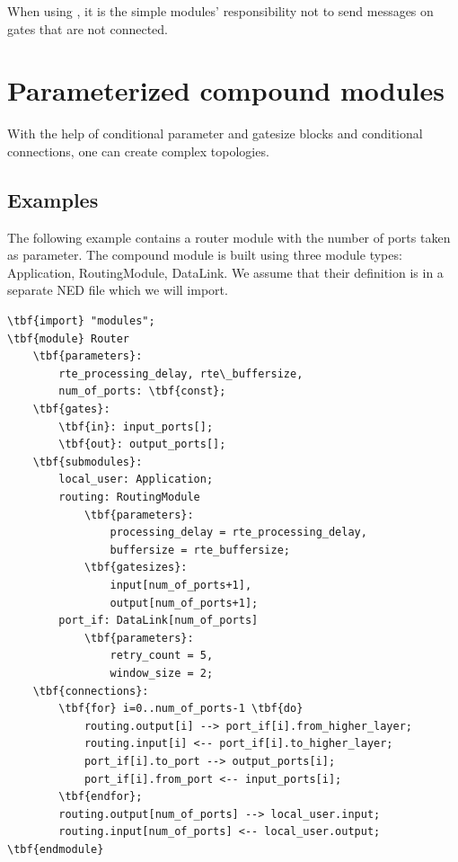 When using , it is the simple modules' responsibility
not to send messages on gates that are not connected.





\section{Parameterized compound modules}


With the help of conditional parameter and gatesize blocks and
conditional connections, one can create complex topologies.





\subsection{Examples}


The following example contains a router module with the number of
ports taken as parameter. The compound module is built using three
module types: Application, RoutingModule, DataLink. We assume that
their definition is in a separate NED file which we will import.


\begin{Verbatim}[commandchars=\\\{\}]
\tbf{import} "modules";
\tbf{module} Router
    \tbf{parameters}:
        rte_processing_delay, rte\_buffersize,
        num_of_ports: \tbf{const};
    \tbf{gates}:
        \tbf{in}: input_ports[];
        \tbf{out}: output_ports[];
    \tbf{submodules}:
        local_user: Application;
        routing: RoutingModule
            \tbf{parameters}:
                processing_delay = rte_processing_delay,
                buffersize = rte_buffersize;
            \tbf{gatesizes}:
                input[num_of_ports+1],
                output[num_of_ports+1];
        port_if: DataLink[num_of_ports]
            \tbf{parameters}:
                retry_count = 5,
                window_size = 2;
    \tbf{connections}:
        \tbf{for} i=0..num_of_ports-1 \tbf{do}
            routing.output[i] --> port_if[i].from_higher_layer;
            routing.input[i] <-- port_if[i].to_higher_layer;
            port_if[i].to_port --> output_ports[i];
            port_if[i].from_port <-- input_ports[i];
        \tbf{endfor};
        routing.output[num_of_ports] --> local_user.input;
        routing.input[num_of_ports] <-- local_user.output;
\tbf{endmodule}
\end{Verbatim}


